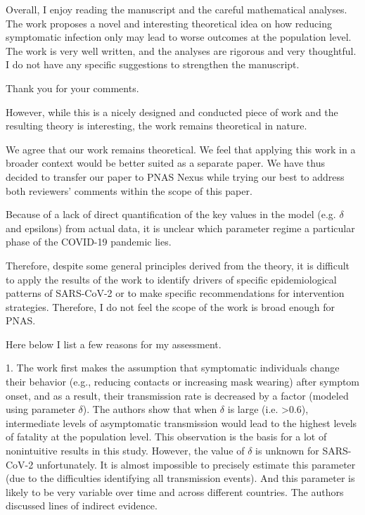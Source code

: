 \documentclass[12pt]{article}
\newcommand{\revtext}{\textsf}
\begin{document}
\revtext{Overall, I enjoy reading the manuscript and the careful mathematical analyses. The work proposes a novel and interesting theoretical idea on how reducing symptomatic infection only may lead to worse outcomes at the population level. The work is very well written, and the analyses are rigorous and very thoughtful. I do not have any specific suggestions to strengthen the manuscript.}

Thank you for your comments.

\revtext{However, while this is a nicely designed and conducted piece of work and the resulting theory is interesting, the work remains theoretical in nature.}

We agree that our work remains theoretical. We feel that applying this work in a broader context would be better suited as a separate paper. We have thus decided to transfer our paper to PNAS Nexus while trying our best to address both reviewers' comments within the scope of this paper.

\revtext{Because of a lack of direct quantification of the key values in the model (e.g. $\delta$ and epsilons) from actual data, it is unclear which parameter regime a particular phase of the COVID-19 pandemic lies.}

\revtext{Therefore, despite some general principles derived from the theory, it is difficult to apply the results of the work to identify drivers of specific epidemiological patterns of SARS-CoV-2 or to make specific recommendations for intervention strategies. Therefore, I do not feel the scope of the work is broad enough for PNAS.}

\revtext{Here below I list a few reasons for my assessment.}

\revtext{1. The work first makes the assumption that symptomatic individuals change their behavior (e.g., reducing contacts or increasing mask wearing) after symptom onset, and as a result, their transmission rate is decreased by a factor (modeled using parameter $\delta$). The authors show that when $\delta$ is large (i.e. >0.6), intermediate levels of asymptomatic transmission would lead to the highest levels of fatality at the population level. This observation is the basis for a lot of nonintuitive results in this study. However, the value of $\delta$ is unknown for SARS-CoV-2 unfortunately. It is almost impossible to precisely estimate this parameter (due to the difficulties identifying all transmission events). And this parameter is likely to be very variable over time and across different countries. The authors discussed lines of indirect evidence.}
\end{document}
